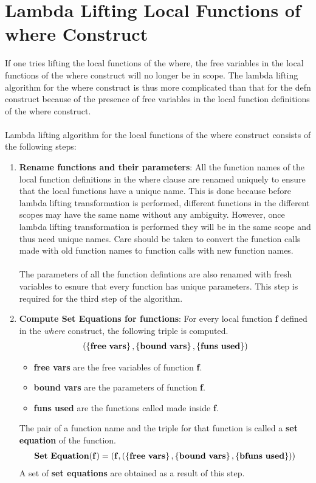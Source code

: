 \documentclass[11pt]{article}
\begin{document}
\section {Lambda Lifting Local Functions of where Construct}\label{lam:algWhere}
If one tries lifting the local functions of the {\sf where}, the free variables in the local functions of the {\sf where} construct will no longer be in scope. The lambda lifting algorithm for the {\sf where} construct is thus more complicated than that for the {\sf defn} construct because of the presence of free variables in the local function definitions of the {\sf where} construct.
~~\\~~\\ 
Lambda lifting algorithm for the local functions of the {\sf where} construct consists of the following steps:
\begin{enumerate}
    \item {\bf Rename functions and their parameters}: 
    All the function names of the local function definitions in the {\sf where} clause are renamed uniquely to ensure that the local functions have a unique name. This is done because before lambda lifting transformation is performed, different functions in the different scopes may have the same name without any ambiguity. However, once lambda lifting transformation is performed they will be in the same scope and thus need unique names. Care should be taken to convert the function calls made with old function names to function calls with new function names.
    ~~\\~~\\ 
    The parameters of all the function defintions are also renamed with fresh variables to esnure that every function has unique parameters. This step is required for the third step of the algorithm.
    \item {\bf Compute Set Equations for functions}:
    For every local function {\bf f} defined in the {\em where} construct, the following triple is computed.
    \begin{align*}
    {\bf (\left\{free~vars\right\},\left\{bound~vars\right\},\left\{funs~used\right\})}
    \end{align*}
    \begin{itemize}
        \item {\bf free vars} are the free variables of function {\bf f}.
        \item {\bf bound vars} are the parameters of function {\bf f}. 
        \item {\bf funs used}  are the functions called made inside {\bf f}.
    \end{itemize}
    The pair of a function name and the triple for that function is called a {\bf set equation} of the function.
    \begin{align*}
        {\bf Set~Equation (f) = (f,(\left\{free~vars\right\},\left\{bound~vars\right\},\left\{bfuns~used\right\}))}
    \end{align*}
    A set of {\bf set equations} are obtained as a result of this step. 
    

\end{enumerate}
\end{document}
